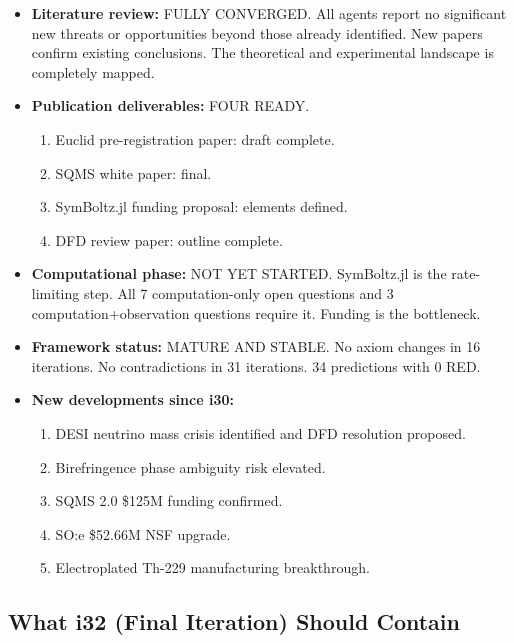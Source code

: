 \documentclass[11pt,a4paper]{article}
\begin{document}
\begin{itemize}
\item \textbf{Literature review:} FULLY CONVERGED. All agents report no significant new threats or opportunities beyond those already identified. New papers confirm existing conclusions. The theoretical and experimental landscape is completely mapped.

\item \textbf{Publication deliverables:} FOUR READY.
\begin{enumerate}
\item Euclid pre-registration paper: draft complete.
\item SQMS white paper: final.
\item SymBoltz.jl funding proposal: elements defined.
\item DFD review paper: outline complete.
\end{enumerate}

\item \textbf{Computational phase:} NOT YET STARTED. SymBoltz.jl is the rate-limiting step. All 7 computation-only open questions and 3 computation+observation questions require it. Funding is the bottleneck.

\item \textbf{Framework status:} MATURE AND STABLE. No axiom changes in 16 iterations. No contradictions in 31 iterations. 34 predictions with 0 RED.

\item \textbf{New developments since i30:}
\begin{enumerate}
\item DESI neutrino mass crisis identified and DFD resolution proposed.
\item Birefringence phase ambiguity risk elevated.
\item SQMS 2.0 \$125M funding confirmed.
\item SO:e \$52.66M NSF upgrade.
\item Electroplated Th-229 manufacturing breakthrough.
\end{enumerate}
\end{itemize}

\subsection{What i32 (Final Iteration) Should Contain}
\end{document}
